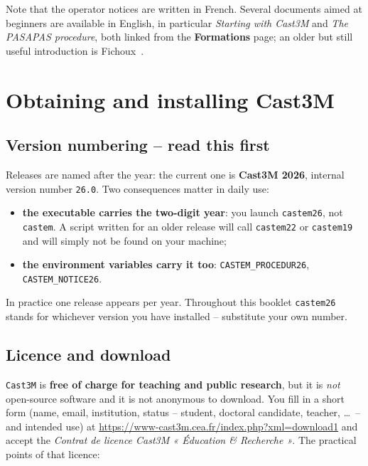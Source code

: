 \noindent Note that the operator notices are written in French. Several
documents aimed at beginners are available in English, in particular
\emph{Starting with Cast3M} and \emph{The PASAPAS procedure}, both linked from
the \textbf{Formations} page; an older but still useful introduction is
Fichoux~\cite{Fichoux:1999}.

\section{Obtaining and installing Cast3M}
\label{sec:intro:install}

\subsection*{Version numbering -- read this first}

Releases are named after the year: the current one is \textbf{Cast3M 2026},
internal version number \texttt{26.0}. Two consequences matter in daily use:

\begin{itemize}
\item \textbf{the executable carries the two-digit year}: you launch
  \texttt{castem26}, not \texttt{castem}. A script written for an older
  release will call \texttt{castem22} or \texttt{castem19} and will simply not
  be found on your machine;
\item \textbf{the environment variables carry it too}:
  \texttt{CASTEM\_PROCEDUR26}, \texttt{CASTEM\_NOTICE26}.
\end{itemize}

\noindent In practice one release appears per year. Throughout this booklet
\texttt{castem26} stands for whichever version you have installed -- substitute
your own number.

\subsection*{Licence and download}

\texttt{Cast3M} is \textbf{free of charge for teaching and public research},
but it is \emph{not} open-source software and it is not anonymous to download.
You fill in a short form (name, email, institution, status -- student,
doctoral candidate, teacher, \ldots\ -- and intended use) at
\url{https://www-cast3m.cea.fr/index.php?xml=download1} and accept the
\emph{Contrat de licence Cast3M « Éducation \& Recherche »}. The practical
points of that licence:


